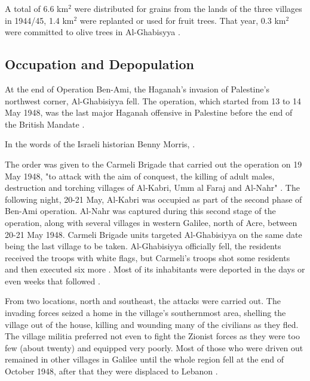 A total of 6.6 km$^{2}$ were distributed for grains from the lands of the three villages in 1944/45, 1.4 km$^{2}$ were replanted or used for fruit trees. That year, 0.3 km$^{2}$ were committed to olive trees in Al-Ghabisyya \citep{Khalidi2015}.

\subsection{Occupation and Depopulation}

At the end of Operation Ben-Ami, the Haganah's invasion of Palestine's northwest corner, Al-Ghabisiyya fell. The operation, which started from 13 to 14 May 1948, was the last major Haganah offensive in Palestine before the end of the British Mandate \citep{Khalidi2015}.

In the words of the Israeli historian Benny Morris,  \cite[p.252]{Morris2004}.

The order was given to the Carmeli Brigade that carried out the operation on 19 May 1948, "to attack with the aim of conquest, the killing of adult males, destruction and torching villages of Al-Kabri, Umm al Faraj and Al-Nahr" \cite[p.253]{Morris2004}. The following night, 20-21 May, Al-Kabri was occupied as part of the second phase of Ben-Ami operation. Al-Nahr was captured during this second stage of the operation, along with several villages in western Galilee, north of Acre, between 20-21 May 1948. Carmeli Brigade units targeted Al-Ghabisiyya on the same date being the last village to be taken. Al-Ghabisiyya officially fell, the residents received the troops with white flags, but Carmeli's troops shot some residents and then executed six more \citep{Morris2008}. Most of its inhabitants were deported in the days or even weeks that followed \citep{Morris2004}.

From two locations, north and southeast, the attacks were carried out. The invading forces seized a home in the village's southernmost area, shelling the village out of the house, killing and wounding many of the civilians as they fled. The village militia preferred not even to fight the Zionist forces as they were too few (about twenty) and equipped very poorly. Most of those who were driven out remained in other villages in Galilee until the whole region fell at the end of October 1948, after that they were displaced to Lebanon \citep{Khalidi2015}.

